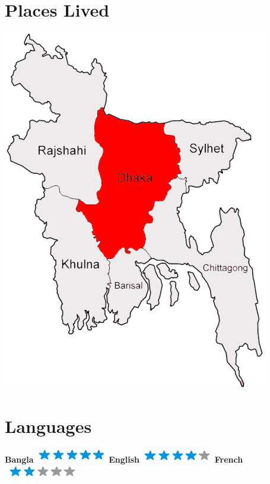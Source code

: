 \documentclass[]{friggeri-cv}
\begin{document}
\begin{aside}
~
~
~
  \section{Places Lived}
    \includegraphics[scale=0.18]{img/italia.png}
    ~
  \section{Languages}
    \textbf{Bangla}\includegraphics[scale=0.40]{img/5stars.png}
    \textbf{English}\includegraphics[scale=0.40]{img/4stars.png}
    \textbf{French}\includegraphics[scale=0.40]{img/2stars.png}
\end{aside}
\end{document}
